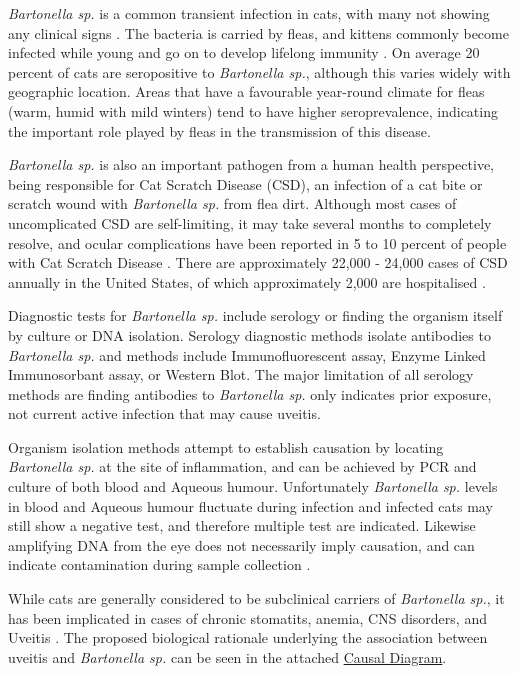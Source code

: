 \documentclass[11pt,twocolumn]{article}
\begin{document}
		\emph{Bartonella sp.} is a common transient infection in cats, with many not showing any clinical signs \cite{Guptill2010}. 
		The bacteria is carried by fleas, and kittens commonly become infected while young and go on to develop lifelong immunity \cite{Brunt2006}.
		On average 20 percent of cats are seropositive to \emph{Bartonella sp.}, although this varies widely with geographic location\cite{Jameson1995a}. Areas that have a favourable year-round climate for fleas (warm, humid with mild winters) tend to have higher seroprevalence, indicating the important role played by fleas in the transmission of this disease.


		\emph{Bartonella sp.} is also an important pathogen from a human health perspective, being responsible for Cat Scratch Disease (CSD), an infection of a cat bite or scratch wound with \emph{Bartonella sp.} from flea dirt. 
		Although most cases of uncomplicated CSD are self-limiting\cite{Brunt2006}, it may take several months to completely resolve, and ocular complications have been reported in 5 to 10 percent of people with Cat Scratch Disease \cite{Wade2000}.
		There are approximately 22,000 - 24,000 cases of CSD annually in the United States, of which approximately 2,000 are hospitalised \cite{Jackson1993}.
	
		Diagnostic tests for \emph{Bartonella sp.} include serology or finding the organism itself by culture or DNA isolation.
		Serology diagnostic methods isolate antibodies to \emph{Bartonella sp.} and methods include Immunofluorescent assay, Enzyme Linked Immunosorbant assay, or Western Blot. 
		The major limitation of all serology methods are finding antibodies to \emph{Bartonella sp.} only indicates prior exposure, not current active infection that may cause uveitis.


		Organism isolation methods attempt to establish causation by locating \emph{Bartonella sp.} at the site of inflammation, and can be achieved by PCR and culture of both blood and Aqueous humour. 
		Unfortunately \emph{Bartonella sp.} levels in blood and Aqueous humour fluctuate during infection and infected cats may still show a negative test, and therefore multiple test are indicated\cite{Guptill2010}. 
		Likewise amplifying DNA from the eye does not necessarily imply causation, and can indicate contamination during sample collection \cite{Powell2010}.
		

		While cats are generally considered to be subclinical carriers of \emph{Bartonella sp.}, it has been implicated in cases of chronic stomatits, anemia, CNS disorders, and Uveitis \cite{Nasir2005}.
		The proposed biological rationale underlying the association between uveitis and \emph{Bartonella sp.} can be seen in the attached \hyperref[fig:1]{Causal Diagram}.
\end{document}
